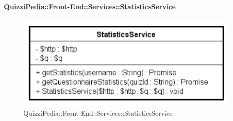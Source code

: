 \paragraph{QuizziPedia::Front-End::Services::StatisticsService}

\label{QuizziPedia::Front-End::Services::StatisticsService}
\begin{figure}[ht]
	\centering
	\includegraphics[scale=0.60]{UML/Classi/Front-End/QuizziPedia_Front-end_Services_StatisticsService.png}
	\caption{QuizziPedia::Front-End::Services::StatisticsService}
\end{figure}\FloatBarrier
